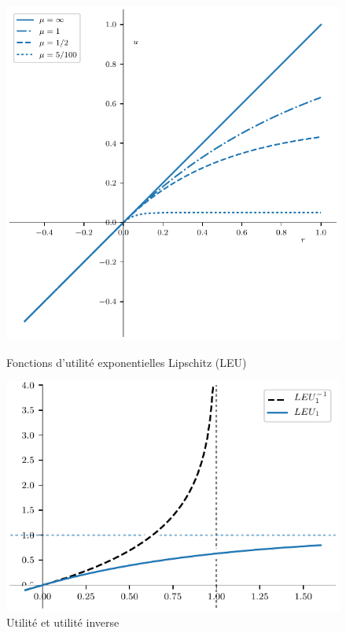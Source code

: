 \begin{figure}[ht]
  \centering
  \includegraphics[width=\textwidth]{../../experiments/fig/leus.pdf}
  \caption[Utilités LEU]{Fonctions d'utilité exponentielles Lipschitz (LEU)}
  \label{fig_leus}


  \includegraphics[width=\textwidth]{../../experiments/fig/leu_inv.pdf}
  \caption{Utilité et utilité inverse}
  \label{fig_leu_inv}
\end{figure}

\clearpage


